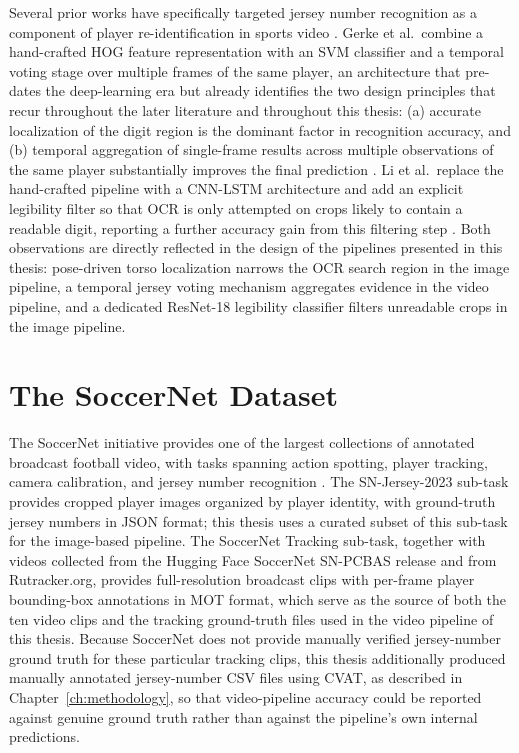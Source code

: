 Several prior works have specifically targeted jersey number recognition
as a component of player re-identification in sports video
\cite{gerke2015soccer,li2018jersey}. Gerke et al.\ combine a
hand-crafted HOG feature representation with an SVM classifier and a
temporal voting stage over multiple frames of the same player, an
architecture that pre-dates the deep-learning era but already
identifies the two design principles that recur throughout the later
literature and throughout this thesis: (a) accurate localization of the
digit region is the dominant factor in recognition accuracy, and (b)
temporal aggregation of single-frame results across multiple
observations of the same player substantially improves the final
prediction \cite{gerke2015soccer}. Li et al.\ replace the hand-crafted
pipeline with a CNN-LSTM architecture and add an explicit legibility
filter so that OCR is only attempted on crops likely to contain a
readable digit, reporting a further accuracy gain from this filtering
step \cite{li2018jersey}. Both observations are directly reflected in
the design of the pipelines presented in this thesis: pose-driven torso
localization narrows the OCR search region in the image pipeline, a
temporal jersey voting mechanism aggregates evidence in the video
pipeline, and a dedicated ResNet-18 legibility classifier filters
unreadable crops in the image pipeline.

\section{The SoccerNet Dataset}

The SoccerNet initiative provides one of the largest collections of
annotated broadcast football video, with tasks spanning action
spotting, player tracking, camera calibration, and jersey number
recognition \cite{deliege2021soccernet}. The SN-Jersey-2023 sub-task
provides cropped player images organized by player identity, with
ground-truth jersey numbers in JSON format; this thesis uses a curated
subset of this sub-task for the image-based pipeline. The SoccerNet
Tracking sub-task, together with videos collected from the Hugging Face
SoccerNet SN-PCBAS release and from Rutracker.org, provides
full-resolution broadcast clips with per-frame player bounding-box
annotations in MOT format, which serve as the source of both the ten
video clips and the tracking ground-truth files used in the video
pipeline of this thesis. Because SoccerNet does not provide manually
verified jersey-number ground truth for these particular tracking
clips, this thesis additionally produced manually annotated
jersey-number CSV files using CVAT, as described in
Chapter~\ref{ch:methodology}, so that video-pipeline accuracy could be
reported against genuine ground truth rather than against the
pipeline's own internal predictions.

